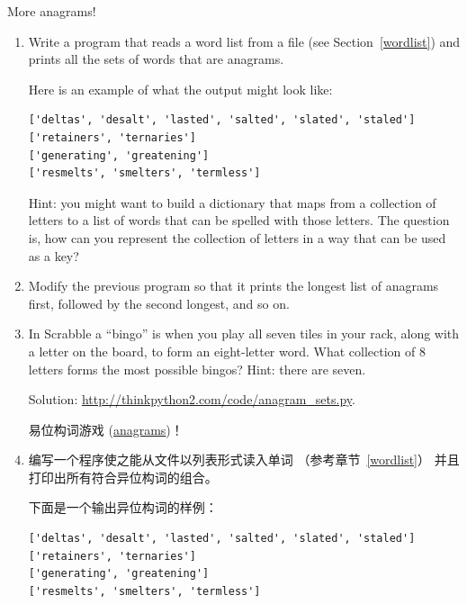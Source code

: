 \begin{exercise}
\label{anagrams}

More anagrams!

\begin{enumerate}

\item Write a program
that reads a word list from a file (see Section~\ref{wordlist}) and
prints all the sets of words that are anagrams.

Here is an example of what the output might look like:

\begin{lstlisting}
['deltas', 'desalt', 'lasted', 'salted', 'slated', 'staled']
['retainers', 'ternaries']
['generating', 'greatening']
['resmelts', 'smelters', 'termless']
\end{lstlisting}

%
Hint: you might want to build a dictionary that maps from a
collection of letters to a list of words that can be spelled with those
letters.  The question is, how can you represent the collection of
letters in a way that can be used as a key?

\item Modify the previous program so that it prints the longest list
of anagrams first, followed by the second longest, and so on.

\item In Scrabble a ``bingo'' is when you play all seven tiles in
your rack, along with a letter on the board, to form an eight-letter
word.  What collection of 8 letters forms the most possible bingos?
Hint: there are seven.


Solution: \url{http://thinkpython2.com/code/anagram_sets.py}.


易位构词游戏 (\href{https://zh.wikipedia.org/wiki/%E6%98%93%E4%BD%8D%E6%9E%84%E8%AF%8D%E6%B8%B8%E6%88%8F}{anagrams})！

\item 编写一个程序使之能从文件以列表形式读入单词 （参考章节~\ref{wordlist}） 并且打印出所有符合异位构词的组合。

下面是一个输出异位构词的样例：

\begin{lstlisting}
['deltas', 'desalt', 'lasted', 'salted', 'slated', 'staled']
['retainers', 'ternaries']
['generating', 'greatening']
['resmelts', 'smelters', 'termless']
\end{lstlisting}


\end{enumerate}
\end{exercise}

